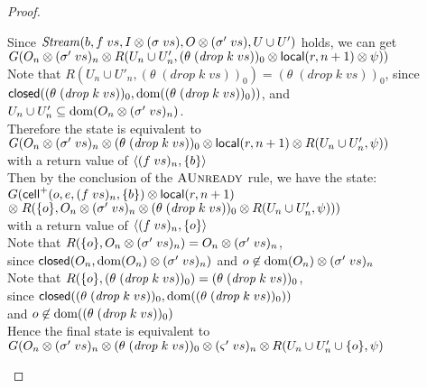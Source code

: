 \begin{proof}
\begin{enumerate}
\begin{tabbedproof}
  \oooo Since $\mathit{Stream}(b, f\;vs, I \otimes (\sigma\;vs), O \otimes (\sigma'\;vs), U \cup U')$ holds, we can get \\ 
  \ooooo $G(O_n \otimes (\sigma'\;vs)_n \otimes R(U_n \cup U'_n, (\theta\;(\mathit{drop}\;k\;vs))_0 \otimes \mathsf{local}({r}, {n+1}) \otimes \psi))$ \\ 
  \oooo Note that $R(U_n \cup U'_n, (\theta\;(\mathit{drop}\;k\;vs))_0) = (\theta\;(\mathit{drop}\;k\;vs))_0$, since \\
  \ooooo $\mathsf{closed}({(\theta\;(\mathit{drop}\;k\;vs))_0}, {\mbox{dom}({(\theta\;(\mathit{drop}\;k\;vs))_0})})$, and \\
  \ooooo $U_n \cup U'_n \subseteq \mbox{dom}({O_n \otimes (\sigma'\;vs)_n})$. \\
  \oooo Therefore the state is equivalent to \\
  \ooooo $G(O_n \otimes (\sigma'\;vs)_n \otimes (\theta\;(\mathit{drop}\;k\;vs))_0 \otimes \mathsf{local}({r}, {n+1}) \otimes R(U_n \cup U'_n, \psi))$ \\ 
  \oooo with a return value of $\left<{(f\;vs)_n},{\{{b}\}}\right>$ \\
  \oooo Then by the conclusion of the $\textsc{AUnready}$ rule, we have the state: \\
  \ooooo $G(\mathsf{cell}^{+}({o}, {e}, {(f\;vs)_n}, {\{{b}\}}) \otimes \mathsf{local}({r}, {n+1}) $ \\
  \oooooo $\otimes\; R(\{{o}\}, O_n \otimes (\sigma'\;vs)_n \otimes (\theta\;(\mathit{drop}\;k\;vs))_0 \otimes R(U_n \cup U'_n, \psi)))$ \\ 
  \oooo with a return value of $\left<{(f\;vs)_n},{\{{o}\}}\right>$ \\ 
  \oooo Note that $R(\{{o}\}, O_n \otimes (\sigma'\;vs)_n) = O_n \otimes (\sigma'\;vs)_n$, \\
  \ooooo since $\mathsf{closed}({O_n}, {\mbox{dom}({O_n}) \otimes (\sigma'\;vs)_n})$ and $o\not\in\mbox{dom}({O_n}) \otimes (\sigma'\;vs)_n$ \\
  \oooo Note that $R(\{{o}\}, (\theta\;(\mathit{drop}\;k\;vs))_0) = (\theta\;(\mathit{drop}\;k\;vs))_0$, \\
  \ooooo since $\mathsf{closed}({(\theta\;(\mathit{drop}\;k\;vs))_0}, {\mbox{dom}({(\theta\;(\mathit{drop}\;k\;vs))_0})})$ \\
  \ooooo and $o\not\in\mbox{dom}({(\theta\;(\mathit{drop}\;k\;vs))_0})$\\
  \oooo Hence the final state is equivalent to \\
  \ooooo $G(O_n \otimes (\sigma'\;vs)_n \otimes (\theta\;(\mathit{drop}\;k\;vs))_0 \otimes (\varsigma'\;vs)_n \otimes R(U_n \cup U'_n \cup \{{o}\}, \psi)$ \\

\end{tabbedproof}
\end{enumerate}
\end{proof}
